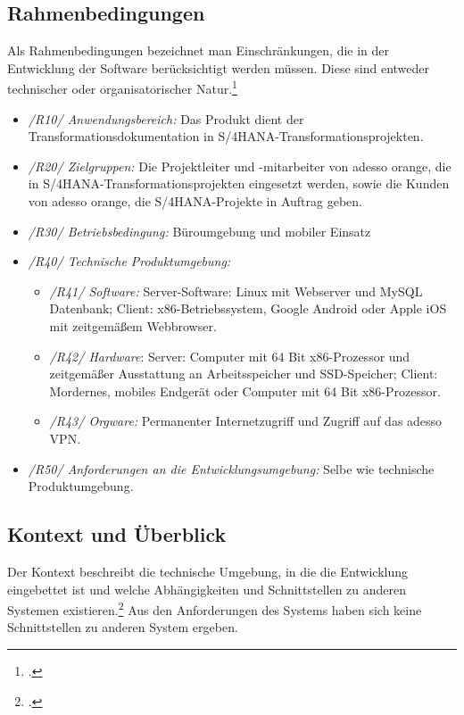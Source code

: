 \subsection{Rahmenbedingungen}
Als Rahmenbedingungen bezeichnet man Einschränkungen, die in der Entwicklung der Software berücksichtigt werden müssen. Diese sind entweder technischer oder organisatorischer Natur.\footcite[Vgl.][S. 459 f.]{balzert}
\begin{itemize}
    \item[] \emph{/R10/ Anwendungsbereich:} Das Produkt dient der Transformationsdokumentation in S/4HANA-Transformationsprojekten.
    \item[] \emph{/R20/ Zielgruppen:} Die Projektleiter und -mitarbeiter von adesso orange, die in S/4HANA-Transformationsprojekten eingesetzt werden, sowie die Kunden von adesso orange, die S/4HANA-Projekte in Auftrag geben.
    \item[] \emph{/R30/ Betriebsbedingung:} Büroumgebung und mobiler Einsatz
    \item[] \emph{/R40/ Technische Produktumgebung:} 
    \begin{itemize}
        \item [] \emph{/R41/ Software:} Server-Software: Linux mit Webserver und MySQL Datenbank; Client: x86-Betriebssystem, Google Android oder Apple iOS mit zeitgemäßem Webbrowser.
        \item [] \emph{/R42/ Hardware}: Server: Computer mit 64 Bit x86-Prozessor und zeitgemäßer Ausstattung an Arbeitsspeicher und SSD-Speicher; Client: Mordernes, mobiles Endgerät oder Computer mit 64 Bit x86-Prozessor.
        \item [] \emph{/R43/ Orgware:} Permanenter Internetzugriff und Zugriff auf das adesso VPN.
    \end{itemize}
    \item[] \emph{/R50/ Anforderungen an die Entwicklungsumgebung:} Selbe wie technische Produktumgebung.
\end{itemize}

\subsection{Kontext und Überblick}
Der Kontext beschreibt die technische Umgebung, in die die Entwicklung eingebettet ist und welche Abhängigkeiten und Schnittstellen zu anderen Systemen existieren.\footcite[Vgl.][S. 461 f.]{balzert} Aus den Anforderungen des Systems haben sich keine Schnittstellen zu anderen System ergeben. 

